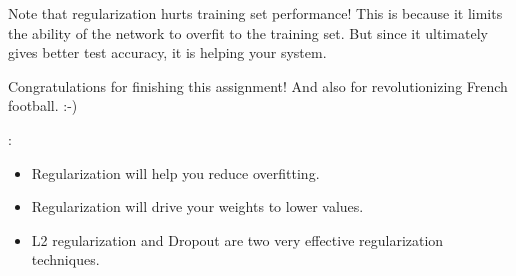Note that regularization hurts training set performance! This is because it limits the ability of the network to overfit to the training set. But since it ultimately gives better test accuracy, it is helping your system.

Congratulations for finishing this assignment! And also for revolutionizing French football. :-)


{:
\begin{itemize}
\item Regularization will help you reduce overfitting.
\item Regularization will drive your weights to lower values.
\item L2 regularization and Dropout are two very effective regularization techniques.
\end{itemize}
}

\clearpage